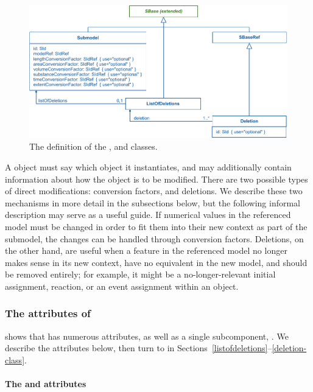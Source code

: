 \begin{figure}[hbt]
  \includegraphics{figs/submodel-uml}
  \caption{The definition of the \Submodel, \Deletion and
    \ListOfDeletions classes.}
  \label{submodel-uml}
\end{figure}

A \Submodel object must say which \Model object it instantiates, and may
additionally contain information about how the \Model object is to be
modified.  There are two possible types of direct modifications:
conversion factors, and deletions.  We describe these two mechanisms in
more detail in the subsections below, but the following informal
description may serve as a useful guide.  If numerical values in the
referenced model must be changed in order to fit them into their new
context as part of the submodel, the changes can be handled through
conversion factors.  Deletions, on the other hand, are useful when a
feature in the referenced model no longer makes sense in its new context, have no equivalent in the new model,
and should be removed entirely; for example, it might be a
no-longer-relevant initial assignment, reaction, or an event assignment
within an \Event object.


\subsubsection{The attributes of }

 shows that \Submodel has numerous attributes, as well
as a single subcomponent, .  We describe the
attributes below, then turn to  in
Sections~\ref{listofdeletions}--\ref{deletion-class}.


\paragraph{The \hspace*{1pt} and  attributes}

